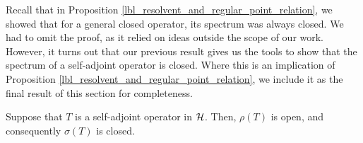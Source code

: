 Recall that in Proposition \eqref{lbl_resolvent_and_regular_point_relation}, we showed that for a general closed operator, its spectrum was always closed. We had to omit the proof, as it relied on ideas outside the scope of our work. However, it turns out that our previous result gives us the tools to show that the spectrum of a self-adjoint operator is closed. Where this is an implication of Proposition \eqref{lbl_resolvent_and_regular_point_relation}, we include it as the final result of this section for completeness.

\begin{theorem}\label{lbl_sa_op_closed_spectrum}
  Suppose that $T$ is a self-adjoint operator in $\mathcal{H}$. Then, $\rho(T)$ is open, and consequently $\sigma(T)$ is closed.
\end{theorem}
